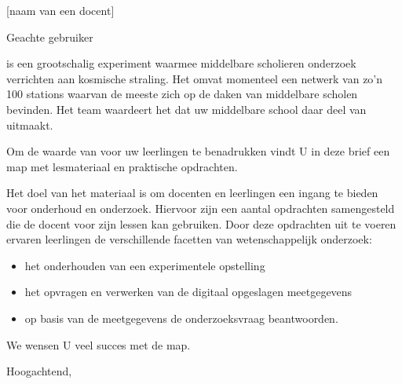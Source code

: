 

\signature{Het \hisparc team}
\address{Science Park 105\\
         1098 XG \\
         Amsterdam}



\begin{letter}{[naam van een docent] \\ [adres van school]}

\opening{Geachte \hisparc gebruiker}

\hisparc is een grootschalig experiment waarmee middelbare scholieren
onderzoek verrichten aan kosmische straling. Het omvat momenteel een
netwerk van zo'n 100 stations waarvan de meeste zich op de daken van
middelbare scholen bevinden. Het \hisparc team waardeert het dat uw
middelbare school daar deel van uitmaakt.

Om de waarde van \hisparc voor uw leerlingen te benadrukken vindt U in
deze brief een \hisparc map met lesmateriaal en praktische opdrachten.

Het doel van het materiaal is om docenten en leerlingen een ingang te
bieden voor onderhoud en onderzoek. Hiervoor zijn een aantal opdrachten
samengesteld die de docent voor zijn lessen kan gebruiken. Door deze
opdrachten uit te voeren ervaren leerlingen de verschillende facetten
van wetenschappelijk onderzoek:
\begin{itemize}
	\item  het onderhouden van een experimentele opstelling
	\item  het opvragen en verwerken van de digitaal opgeslagen meetgegevens
	\item op basis van de meetgegevens de onderzoeksvraag beantwoorden.
\end{itemize}

We wensen U veel succes met de \hisparc map.

\closing{Hoogachtend,}


\end{letter}

